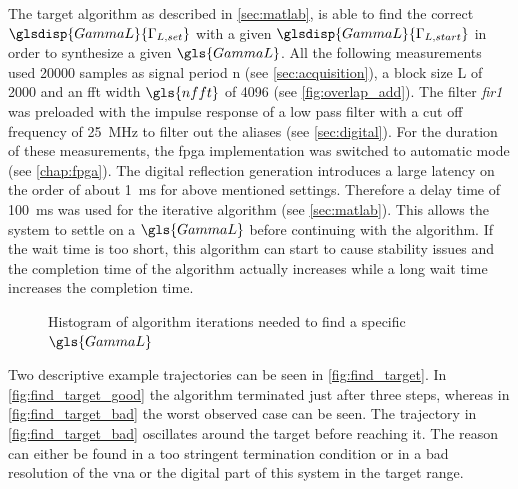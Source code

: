 \documentclass[12pt,a4paper,parskip=full,abstract=true,BCOR=12mm,twoside,open=right]{scrreprt}
\def\device#1{\textit{#1}}
\begin{document}
The target algorithm as described in \cref{sec:matlab}, is able to find the
correct $\glsdisp{GammaL}{\Gamma_{L,set}}$ with a given $\glsdisp{GammaL}{\Gamma_{L,start}}$ in order to synthesize
a given $\gls{GammaL}$. All the following measurements used 20000 samples as %
signal period \gls{n} (see \cref{sec:acquisition}), a block size \gls{L} of 2000 and an \gls{fft} width $\gls{nfft}$
of 4096 (see \cref{fig:overlap_add}). The filter \device{fir1} was preloaded with the
impulse response of a low pass filter with a cut off frequency of \SI{25}{\mega\hertz} to
filter out the aliases (see \cref{sec:digital}). For the duration of these measurements,
the \gls{fpga} implementation was switched to automatic mode (see \cref{chap:fpga}). The digital reflection generation introduces %
a large latency on the order of about \SI{1}{\milli\second} for above mentioned settings.
Therefore a delay time of \SI{100}{\milli\second} was used for the iterative algorithm %
(see \cref{sec:matlab}). This allows the system to settle on a $\gls{GammaL}$ before continuing
with the algorithm. If the wait time is too short, this algorithm can start to
cause stability issues and the completion time of the algorithm actually increases while
a long wait time increases the completion time.

\begin{figure}[htb]
    \centering
    \caption{Histogram of algorithm iterations needed to find a specific $\gls{GammaL}$}
    \label{fig:iteration_hist}
\end{figure}

Two descriptive example trajectories can be seen in \cref{fig:find_target}. In
\cref{fig:find_target_good} the algorithm terminated just after three steps,
whereas in \cref{fig:find_target_bad} the worst observed case can be seen. The
trajectory in \cref{fig:find_target_bad} oscillates around the target before
reaching it. The reason can either be found in a too stringent termination condition or
in a bad resolution of the \gls{vna} or the digital part of this system in the
target range.
\end{document}
